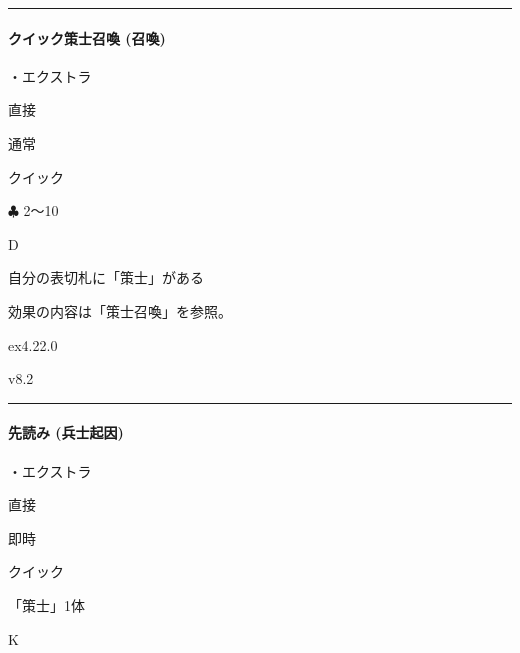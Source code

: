 \documentclass[letterpaper,10pt,dvipdfmx]{sphinxmanual}
\begin{document}
\bigskip\hrule\bigskip



\paragraph{クイック策士召喚 (召喚)}
\label{\detokenize{auto/frameActionlist:act-quicksummonstrategist}}\label{\detokenize{auto/frameActionlist:id66}}
\sphinxAtStartPar
{}

\sphinxAtStartPar
・エクストラ

\sphinxAtStartPar
{} 直接

\sphinxAtStartPar
{} 通常

\sphinxAtStartPar
{} クイック

\sphinxAtStartPar
{} {\normalsize $\clubsuit$} 2〜10

\sphinxAtStartPar
{} D

\sphinxAtStartPar
{}

\sphinxAtStartPar
自分の表切札に「策士」がある

\sphinxAtStartPar
{}

\sphinxAtStartPar
効果の内容は「策士召喚」を参照。

\sphinxAtStartPar
{}  ex4.22.0

\sphinxAtStartPar
{}  v8.2


\bigskip\hrule\bigskip



\paragraph{先読み (兵士起因)}
\label{\detokenize{auto/frameActionlist:act-strategistpredict}}\label{\detokenize{auto/frameActionlist:id67}}
\sphinxAtStartPar
{}

\sphinxAtStartPar
・エクストラ

\sphinxAtStartPar
{} 直接

\sphinxAtStartPar
{} 即時

\sphinxAtStartPar
{} クイック

\sphinxAtStartPar
{} 「策士」1体

\sphinxAtStartPar
{} K
\end{document}

